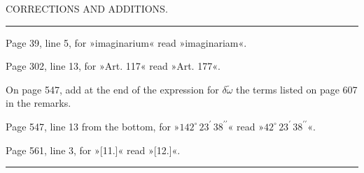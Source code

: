 \clearpage
\begingroup
{}
\renewcommand{\headrulewidth}{0pt}
\begin{center}\large CORRECTIONS AND ADDITIONS.\end{center}
\begin{center}\rule{.09\linewidth}{.4pt}\end{center}

\par\noindent\hspace*{\parindent}Page 39, line 5, for »imaginarium« read »imaginariam«.

\par\noindent\hspace*{\parindent}Page 302, line 13, for »Art. 117« read »Art. 177«.

\par\noindent\hspace*{\parindent}On page 547, add at the end of the expression for \(\delta\tilde{\omega}\) the terms listed on page 607
in the remarks.

\par\noindent\hspace*{\parindent}Page 547, line 13 from the bottom, for »\(142^{\circ}\,23^{\prime}\,38^{\prime\prime}\)« read »\(42^{\circ}\,23^{\prime}\,38^{\prime\prime}\)«.

\par\noindent\hspace*{\parindent}Page 561, line 3, for »[11.]« read »[12.]«.
\par\begin{center}\rule{.24\linewidth}{.4pt}\end{center}
\clearpage
\endgroup
